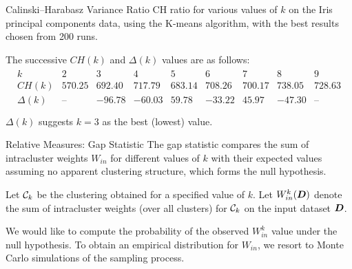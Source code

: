 \begin{frame}[fragile]{Calinski--Harabasz Variance Ratio}
  \small
  CH ratio for various values
  of $k$ on the Iris principal components data, using the K-means
  algorithm, with the best results chosen from 200 runs.
\begin{figure}
    \centering
    \def\pshlabel#1{ {\footnotesize #1}}
    \def\psvlabel#1{ {\footnotesize #1}}
\end{figure}
\vspace{0.2in}
  The successive
  $\mathit{CH}(k)$ and $\Delta(k)$ values are as follows:
  \begin{align*}
    \begin{array}{c|cccccccc}
    k & 2 & 3 & 4 & 5 & 6 & 7 & 8 & 9\\
    \hline
    \mathit{CH}(k) & 570.25 & 692.40 & 717.79 & 683.14 & 708.26 & 700.17 & 738.05
    & 728.63\\
    \Delta(k) & \text{--} & -96.78 & -60.03 & 59.78 & -33.22 & 45.97 &
    -47.30 & \text{--}\\
    \end{array}
  \end{align*}
$\Delta(k)$ suggests $k=3$ as the best (lowest) value.
\end{frame}


\begin{frame}{Relative Measures: Gap Statistic}
The gap statistic compares the sum of
intracluster
weights $W_{in}$ 
for different values of $k$ with their expected values assuming
no apparent clustering structure, which forms the null hypothesis.

\bigskip
Let ${\mathcal C}_k$ be the clustering obtained for a specif\/{i}ed value of $k$.
Let $W_{in}^k({\boldsymbol D})$ denote
the sum of intracluster weights (over all clusters) for ${\mathcal C}_k$ on the
input dataset ${\boldsymbol D}$.

\bigskip
We would like to compute the probability of the observed
$W_{in}^k$ value under the null hypothesis.
To obtain an empirical distribution for $W_{in}$, we resort to Monte
Carlo simulations of the sampling process.  
\end{frame}

